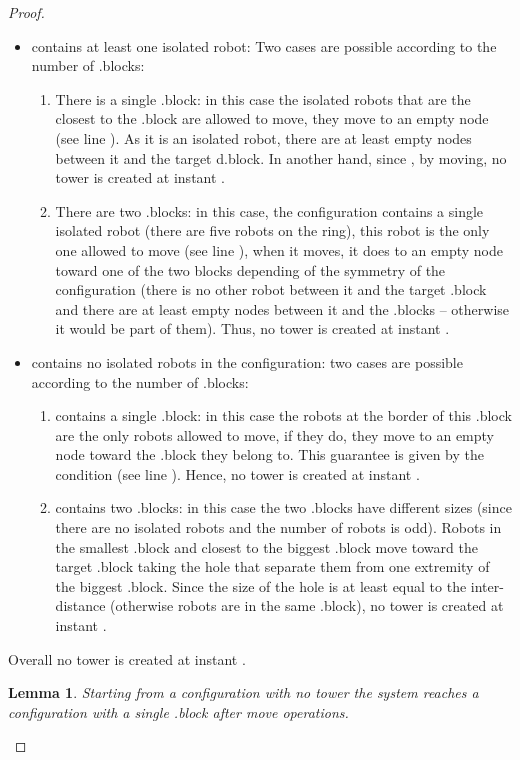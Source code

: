 \documentclass[12pt]{llncs}
\newtheorem{lem}{Lemma}
\begin{document}
\begin{proof}
\begin{itemize}
\item{ contains at least one isolated robot:} Two cases are possible according to the number of .blocks:
\begin{enumerate}
\item{There is a single .block:} in this case the isolated robots that are the closest to the .block are allowed to move, they move to an empty node (see line ). As it is an isolated robot, there are at least  empty nodes between it and the target d.block. In another hand, since , by moving, no tower is created at instant .
\item{There are two .blocks:} in this case, the configuration contains a single isolated robot (there are five robots on the ring), this robot is the only one allowed to move (see line ), when it moves, it does to an empty node toward one of the two blocks depending of the symmetry of the configuration (there is no other robot between it and the target .block and there are at least  empty nodes between it and the .blocks -- otherwise it would be part of them). Thus, no tower is created at instant .
\end{enumerate}
\item{ contains no isolated robots in the configuration:} two cases are possible according to the number of .blocks:
\begin{enumerate}
\item{ contains a single .block:} in this case the robots at the border of this .block are the only robots allowed to move, if they do, they move to an empty node toward the .block they belong to. This guarantee is given by the condition  (see line ).
Hence, no tower is created at instant .
\item{ contains two .blocks:} in this case the two .blocks have different sizes (since there are no isolated robots and the number of robots is odd). Robots in the smallest .block and closest to the biggest .block move toward the target .block taking the hole that separate them from one extremity of the biggest .block. Since the size of the hole is at least equal to the inter-distance (otherwise robots are in the same .block), no tower is created at instant .
\end{enumerate}
\end{itemize}
Overall no tower is created at instant .

\begin{lem}
\label{lem:ph2}
Starting from a configuration with no tower the system reaches a configuration with a single .block after  move operations.
\end{lem}


\end{proof}
\end{document}
